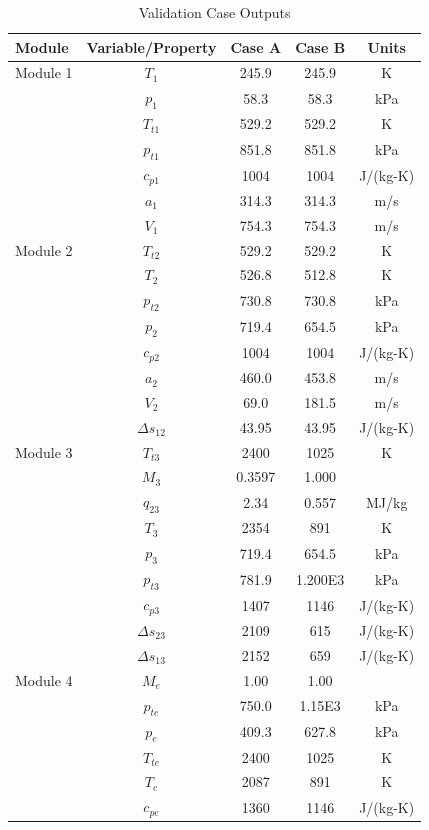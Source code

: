 \documentclass[conf]{new-aiaa} %
\begin{document}
\begin{longtable}[c]{lcccc} %
    \caption{\label{tab:val_case_output} Validation Case Outputs}\\
    \hline
    Module& Variable/Property& Case A& Case B& Units\\\hline
    \endfirsthead
    Module 1& $T_1$& 245.9& 245.9& K\\
    & $p_1$& 58.3& 58.3& kPa\\
    & $T_{t1}$& 529.2& 529.2& K\\
    & $p_{t1}$& 851.8& 851.8& kPa\\
    & $c_{p1}$& 1004& 1004& J/(kg-K)\\
    & $a_1$& 314.3& 314.3& m/s\\
    & $V_1$& 754.3& 754.3& m/s\\\hline
    Module 2& $T_{t2}$& 529.2& 529.2& K\\
    & $T_2$& 526.8& 512.8& K\\
    & $p_{t2}$& 730.8& 730.8& kPa\\
    & $p_2$& 719.4& 654.5& kPa\\
    & $c_{p2}$& 1004& 1004& J/(kg-K)\\
    & $a_2$& 460.0& 453.8& m/s\\
    & $V_2$& 69.0& 181.5& m/s\\
    & $\Delta s_{12}$& 43.95& 43.95& J/(kg-K)\\\hline
    Module 3& $T_{t3}$& 2400& 1025& K\\
    & $M_3$& 0.3597& 1.000\\
    & $q_{23}$& 2.34& 0.557& MJ/kg\\
    & $T_3$& 2354& 891& K\\
    & $p_3$& 719.4& 654.5& kPa\\
    & $p_{t3}$& 781.9& 1.200E3& kPa\\
    & $c_{p3}$& 1407& 1146& J/(kg-K)\\
    & $\Delta s_{23}$& 2109& 615& J/(kg-K)\\
    & $\Delta s_{13}$& 2152& 659& J/(kg-K)\\\hline
    Module 4& $M_e$& 1.00& 1.00\\
    & $p_{te}$& 750.0& 1.15E3& kPa\\
    & $p_e$& 409.3& 627.8& kPa\\
    & $T_{te}$& 2400& 1025& K\\
    & $T_e$& 2087& 891& K\\
    & $c_{pe}$& 1360& 1146& J/(kg-K)\\

\end{longtable}
\end{document}
